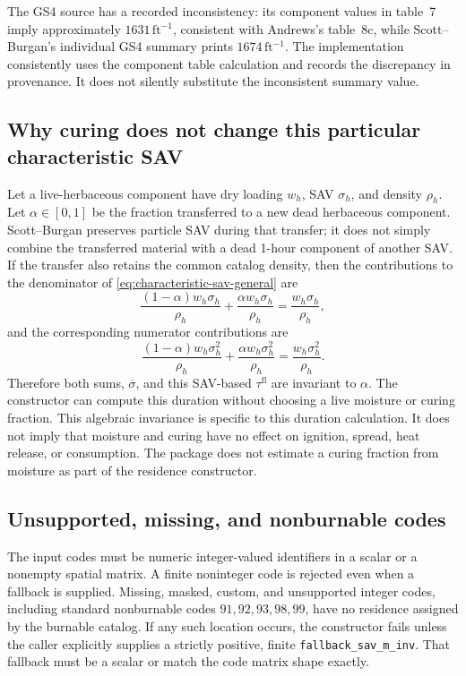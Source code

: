 \documentclass[11pt,a4paper]{article}
\begin{document}
The GS4 source has a recorded inconsistency: its component values in table~7
imply approximately $1631\,\mathrm{ft^{-1}}$, consistent with Andrews's
table~8c, while Scott--Burgan's individual GS4 summary prints
$1674\,\mathrm{ft^{-1}}$. The implementation consistently uses the component
table calculation and records the discrepancy in provenance. It does not
silently substitute the inconsistent summary value.

\subsection{Why curing does not change this particular characteristic SAV}

Let a live-herbaceous component have dry loading $w_h$, SAV $\sigma_h$, and
density $\rho_h$. Let $\alpha\in[0,1]$ be the fraction transferred to a new dead
herbaceous component. Scott--Burgan preserves particle SAV during that transfer;
it does not simply combine the transferred material with a dead 1-hour
component of another SAV.\cite{scottburgan2005}
If the transfer also retains the common catalog density, then the contributions
to the denominator of \eqref{eq:characteristic-sav-general} are
\begin{equation}
 \frac{(1-\alpha)w_h\sigma_h}{\rho_h}
 +\frac{\alpha w_h\sigma_h}{\rho_h}
 =\frac{w_h\sigma_h}{\rho_h},
\end{equation}
and the corresponding numerator contributions are
\begin{equation}
 \frac{(1-\alpha)w_h\sigma_h^2}{\rho_h}
 +\frac{\alpha w_h\sigma_h^2}{\rho_h}
 =\frac{w_h\sigma_h^2}{\rho_h}.
\end{equation}
Therefore both sums, $\overline\sigma$, and this SAV-based $\tau^{\mathrm{fl}}$ are invariant to
$\alpha$. The constructor can compute this duration without choosing a live
moisture or curing fraction. This algebraic invariance is specific to this
duration calculation. It does not imply that moisture and curing have no effect
on ignition, spread, heat release, or consumption. The package does not
estimate a curing fraction from moisture as part of the residence constructor.

\subsection{Unsupported, missing, and nonburnable codes}

The input codes must be numeric integer-valued identifiers in a scalar or a
nonempty spatial matrix. A finite noninteger code is rejected even when a
fallback is supplied. Missing, masked, custom, and unsupported integer codes,
including standard nonburnable codes $91,92,93,98,99$, have no residence assigned
by the burnable catalog. If any such location occurs, the constructor fails
unless the caller explicitly supplies a strictly positive, finite
\texttt{fallback\_sav\_m\_inv}. That fallback must be a scalar or match the
code matrix shape exactly.
\end{document}
